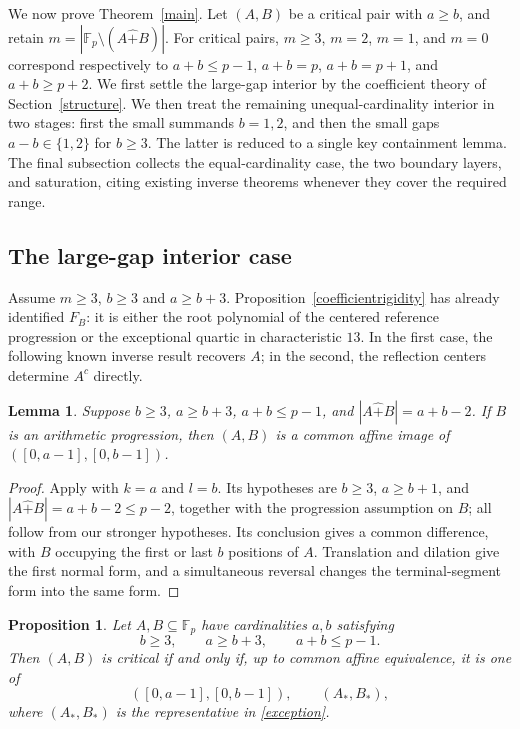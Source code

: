 \documentclass[10pt,a4paper]{amsart}
\newtheorem{lemma}{Lemma}[section]
\newtheorem{proposition}{Proposition}[section]
\newcommand{\F}{\mathbb{F}_p}
\newcommand{\rs}{\mathbin{\widehat+}}
\begin{document}
We now prove Theorem~\ref{main}.  Let $(A,B)$ be a critical pair with
$a\ge b$, and retain $m=|\F\setminus(A\rs B)|$.  For critical pairs,
$m\ge3$, $m=2$, $m=1$, and $m=0$ correspond respectively to
$a+b\le p-1$, $a+b=p$, $a+b=p+1$, and $a+b\ge p+2$.
We first settle the large-gap interior by the coefficient theory of
Section~\ref{structure}.  We then treat the remaining unequal-cardinality
interior in two stages: first the small summands $b=1,2$, and then the
small gaps $a-b\in\{1,2\}$ for $b\ge3$.  The latter is reduced to a single
key containment lemma.  The final subsection collects the equal-cardinality
case, the two boundary layers, and saturation, citing existing inverse
theorems whenever they cover the required range.

\subsection{The large-gap interior case}\label{largegapinterior}

Assume $m\ge3$, $b\ge3$ and $a\ge b+3$.
Proposition~\ref{coefficientrigidity} has already identified $F_B$:
it is either the root polynomial of the centered reference progression
or the exceptional quartic in characteristic $13$.  In the first case,
the following known inverse result recovers $A$; in the second, the
reflection centers determine $A^c$ directly.

\begin{lemma}\label{allAPbridge}
Suppose $b\ge3$, $a\ge b+3$, $a+b\le p-1$, and
$|A\rs B|=a+b-2$.  If $B$ is an arithmetic progression, then $(A,B)$
is a common affine image of $([0,a-1],[0,b-1])$.
\end{lemma}
\begin{proof}
Apply \cite[Theorem 1.5(ii)]{LQ} with $k=a$ and $l=b$.
Its hypotheses are $b\ge3$, $a\ge b+1$, and
$|A\rs B|=a+b-2\le p-2$, together with the progression assumption
on $B$; all follow from our stronger hypotheses.  Its conclusion gives
a common difference, with $B$ occupying the first or last $b$ positions
of $A$.
Translation and dilation give the first normal form, and a simultaneous
reversal changes the terminal-segment form into the same form.
\end{proof}

\begin{proposition}\label{lg}
Let $A,B\subseteq\F$ have cardinalities $a,b$ satisfying
\[
 b\ge3,\qquad a\ge b+3,\qquad a+b\le p-1.
\]
Then $(A,B)$ is critical if and only if, up to common affine equivalence,
it is one of
\[
 ([0,a-1],[0,b-1]),\qquad (A_*,B_*),
\]
where $(A_*,B_*)$ is the representative in \eqref{exception}.
\end{proposition}
\end{document}
